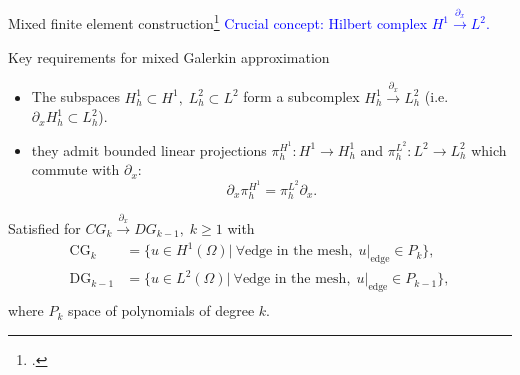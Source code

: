 \documentclass[serif]{beamer} %
\begin{document}
\begin{frame}{Mixed finite element construction\footcite{arnold2006acta}}
	\textcolor{blue}{Crucial concept: Hilbert complex $H^1 \xrightarrow{\partial_x} L^2$.} \\
	\begin{block}{Key requirements for mixed Galerkin approximation}
		
	\begin{itemize}
		\item The subspaces $H^1_h \subset H^1, \; L^2_h \subset L^2$ form a subcomplex $H^1_h \xrightarrow{\partial_x} L^2_h$ \hspace{1cm}(i.e. $\partial_x H^1_h \subset L^2_h$).
		\item they admit bounded linear projections $\pi_h^{H^1}: H^1 \rightarrow  
		H^1_h$  and $\pi_h^{L^2}: L^2 \rightarrow  
		L^2_h$ which commute with $\partial_x$:
		\vspace*{-\baselineskip}\vspace*{3pt}
		\[\partial_x \pi_h^{H^1} = \pi_h^{L^2} \partial_x.\]
	\end{itemize}
	\end{block}

	Satisfied for $CG_k \xrightarrow{\partial_x} DG_{k-1}, \; k\ge 1$ with
	\begin{equation*}
		\begin{aligned}
			\mathrm{CG}_k &= \{u \in H^1(\Omega) | \: \forall \text{edge in the mesh}, \; u|_{\text{edge}} \in P_k\}, \\
			\mathrm{DG}_{k-1} &= \{u \in L^2(\Omega) | \: \forall \text{edge in the mesh}, \; u|_{\text{edge}} \in P_{k-1}\}, \\
		\end{aligned}
	\end{equation*}
	where $P_k$ space of polynomials of degree $k$.
	\vspace{.1cm}
\end{frame}
\end{document}
